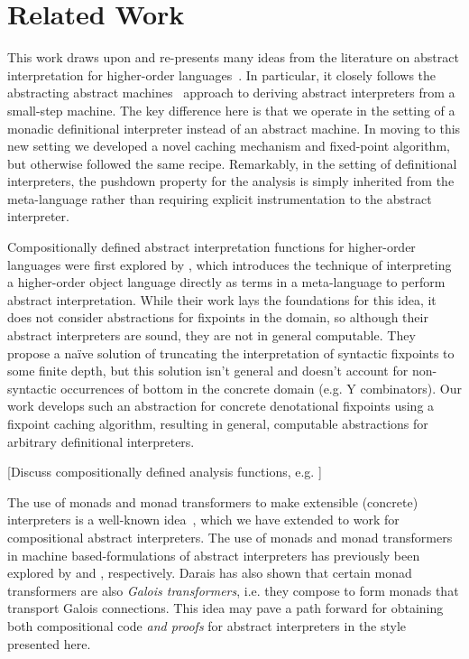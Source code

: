 \section{Related Work}\label{s:related-work}

This work draws upon and re-presents many ideas from the literature on
abstract interpretation for higher-order
languages~\cite{dvanhorn:Midtgaard2012Controlflow}.  In particular, it
closely follows the abstracting abstract
machines~\cite{dvanhorn:VanHorn2010Abstracting,dvanhorn:VanHorn2012Systematic}
approach to deriving abstract interpreters from a small-step
machine. The key difference here is that we operate in the setting of
a monadic definitional interpreter instead of an abstract machine. In
moving to this new setting we developed a novel caching mechanism and
fixed-point algorithm, but otherwise followed the same
recipe. Remarkably, in the setting of definitional interpreters, the
pushdown property for the analysis is simply inherited from the
meta-language rather than requiring explicit instrumentation to the
abstract interpreter.

Compositionally defined abstract interpretation functions for
higher-order languages were first explored by
\citet{local:jones-book1995}, which introduces the technique of
interpreting a higher-order object language directly as terms in a
meta-language to perform abstract interpretation. While their work
lays the foundations for this idea, it does not consider abstractions
for fixpoints in the domain, so although their abstract interpreters
are sound, they are not in general computable. They propose a naïve
solution of truncating the interpretation of syntactic fixpoints to
some finite depth, but this solution isn't general and doesn't account
for non-syntactic occurrences of bottom in the concrete domain (e.g. Y
combinators). Our work develops such an abstraction for concrete
denotational fixpoints using a fixpoint caching algorithm, resulting
in general, computable abstractions for arbitrary definitional
interpreters.

[Discuss compositionally defined analysis functions,
  e.g. \cite{dvanhorn:citeulike:14288879}]

The use of monads and monad transformers to make extensible (concrete)
interpreters is a well-known
idea~\cite{davdar:Moggi:1989:Monads,local:steele-popl94,dvanhorn:Liang1995Monad},
which we have extended to work for compositional abstract
interpreters.  The use of monads and monad transformers in machine
based-formulations of abstract interpreters has previously been
explored by \citet{dvanhorn:Sergey2013Monadic} and
\citet{local:darais-oopsla2015}, respectively.  Darais has also shown
that certain monad transformers are also \emph{Galois transformers},
i.e. they compose to form monads that transport Galois connections.
This idea may pave a path forward for obtaining both compositional
code \emph{and proofs} for abstract interpreters in the style
presented here.

